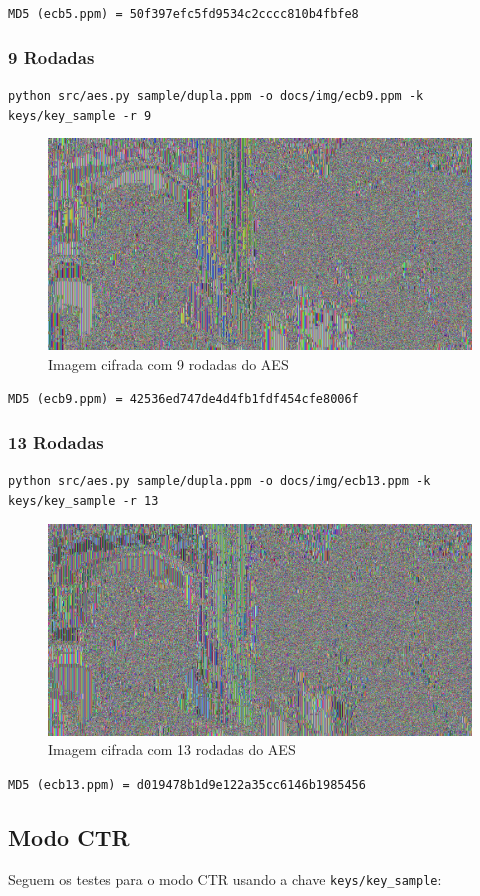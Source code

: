 \documentclass[12pt]{article}
\begin{document}
\noindent \texttt{MD5 (ecb5.ppm) = 50f397efc5fd9534c2cccc810b4fbfe8}

\subsubsection{9 Rodadas}

\texttt{python src/aes.py sample/dupla.ppm -o docs/img/ecb9.ppm -k keys/key\_sample -r 9}

\begin{figure}[H]
	\centering
    \includegraphics[width=.5\textwidth]{img/ecb9.jpg}
    \caption{Imagem cifrada com 9 rodadas do AES}
\end{figure}

\noindent \texttt{MD5 (ecb9.ppm) = 42536ed747de4d4fb1fdf454cfe8006f}

\subsubsection{13 Rodadas}

\texttt{python src/aes.py sample/dupla.ppm -o docs/img/ecb13.ppm -k keys/key\_sample -r 13}

\begin{figure}[H]
	\centering
    \includegraphics[width=.5\textwidth]{img/ecb13.jpg}
    \caption{Imagem cifrada com 13 rodadas do AES}
\end{figure}

\noindent \texttt{MD5 (ecb13.ppm) = d019478b1d9e122a35cc6146b1985456}

\subsection{Modo CTR}

Seguem os testes para o modo CTR usando a chave \texttt{keys/key\_sample}:
\end{document}
